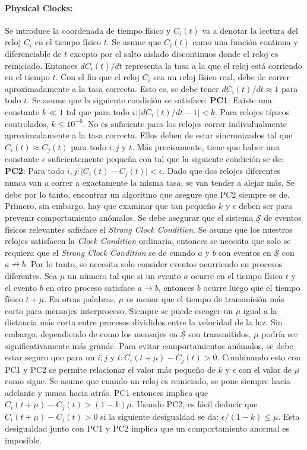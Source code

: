 \paragraph{\textnormal{\textbf{Physical Clocks:}}}
Se introduce la coordenada de tiempo físico y $C_i(t)$ va a denotar la lectura del reloj $C_i$ en el tiempo físico $t$. Se asume que $C_i(t)$ como una función continua y diferenciable de $t$ excepto por el salto aislado discontinuos donde el reloj es reiniciado. Entonces $dC_i(t)/dt$ representa la tasa a la que el reloj está corriendo en el tiempo $t$. Con el fin que el reloj $C_i$ sea un reloj físico real, debe de correr aproximadamente a la tasa correcta. Esto es, se debe tener $dC_i(t)/dt \approx 1$ para todo $t$. Se asume que la siguiente condición se satisface: \textbf{PC1}: Existe una constante $k \ll 1$ tal que para todo $i: \vert dC_i(t)/dt -1 \vert < k$. Para relojes típicos controlados, $k \leq 10^{-6}$. No es suficiente para los relojes correr individualmente aproximadamente a la tasa correcta. Ellos deben de estar sincronizados tal que $C_i(t) \approx C_j(t)$ para todo $i, j$ y $t$. Más precisamente, tiene que haber una constante $\epsilon$ suficientemente pequeña con tal que la siguiente condición se de: \textbf{PC2}: Para todo $i, j: \vert C_i(t) - C_j(t)\vert < \epsilon$. Dado que dos relojes diferentes nunca van a correr a exactamente la misma tasa, se van tender a alejar más. Se debe por lo tanto, encontrar un algoritmo que asegure que PC2 siempre se de. Primero, sin embargo, hay que examinar que tan pequeño $k$ y $\epsilon$ deben ser para prevenir comportamiento anómalos. Se debe asegurar que el sistema $\underline{\mathscr{S}}$ de eventos físicos relevantes safisface el \emph{Strong Clock Condition}. Se asume que los nuestros relojes satisfacen la \emph{Clock Condition} ordinaria, entonces se necesita que solo se requiera que el \emph{Strong Clock Condition} se de cuando $a$ y $b$ son eventos en $\underline{\mathscr{S}}$ con $a \nrightarrow b$. Por lo tanto, se necesita solo consider eventos ocurriendo en procesos diferentes. Sea $\mu$ un número tal que si un evento $a$ ocurre en el tiempo físico $t$ y el evento $b$ en otro proceso satisface $a \boldsymbol{\to} b$, entonces $b$ ocurre luego que el tiempo físico $t + \mu$. En otras palabras, $\mu$ es menor que el tiempo de transmisión más corto para mensajes interproceso. Siempre se puede escoger un $\mu$ igual a la distancia más corta entre procesos divididos entre la velocidad de la luz. Sin embargo, dependiendo de como los mensajes en  $\underline{\mathscr{S}}$ son transmitidos, $\mu$ podría ser significativamente más grande. Para evitar comportamientos anómalos, se debe estar seguro que para un $i, j$ y $t: C_i(t + \mu) - C_j(t) > 0$. Combinando esto con PC1 y PC2 se permite relacionar el valor más pequeño de $k$ y $\epsilon$ con el valor de $\mu$ como sigue. Se asume que cuando un reloj es reiniciado, se pone siempre hacia adelante y nunca hacia atrás. PC1 entonces implica que $C_i(t + \mu) - C_j(t) > (1 - k)\mu$. Usando PC2, es fácil deducir que $C_i(t + \mu) - C_j(t) > 0$ si la siguiente desigualdad se da: $\epsilon/(1 - k) \leq \mu$. Esta desigualdad junto con PC1 y PC2 implica que un comportamiento anormal es imposible.

